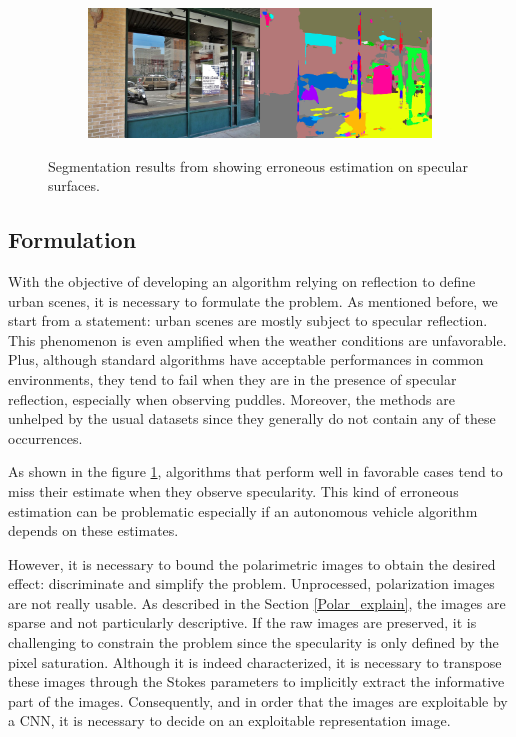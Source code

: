 \begin{figure}[ht]
	
	\begin{subfigure}[b]{.8\linewidth}   
		\centering 
		\includegraphics[width=\linewidth]{Figures/Formulation/image_seg_fail3.png}
	\end{subfigure}
	
	
	
	\caption[Reflection erroneous segmentations from RGB]{Segmentation results from \cite{zhou2018semantic} showing erroneous estimation on specular surfaces.}
	\label{fig:fail-seg}
\end{figure}

\subsection{Formulation}\label{form_pol}
With the objective of developing an algorithm relying on reflection to define urban scenes, it is necessary to formulate the problem. As mentioned before, we start from a statement: urban scenes are mostly subject to specular reflection. This phenomenon is even amplified when the weather conditions are unfavorable. Plus, although standard algorithms have acceptable performances in common environments, they tend to fail when they are in the presence of specular reflection, especially when observing puddles. Moreover, the methods are unhelped by the usual datasets since they generally do not contain any of these occurrences.




As shown in the figure \ref{fig:fail-seg}, algorithms that perform well in favorable cases tend to miss their estimate when they observe specularity. This kind of erroneous estimation can be problematic especially if an autonomous vehicle algorithm depends on these estimates.

However, it is necessary to bound the polarimetric images to obtain the desired effect: discriminate and simplify the problem.
Unprocessed, polarization images are not really usable. As described in the Section \ref{Polar_explain}, the images are sparse and not particularly descriptive. If the raw images are preserved, it is challenging to constrain the problem since the specularity is only defined by the pixel saturation. Although it is indeed characterized, it is necessary to transpose these images through the Stokes parameters to implicitly extract the informative part of the images. Consequently, and in order that the images are exploitable by a CNN, it is necessary to decide on an exploitable representation image.


